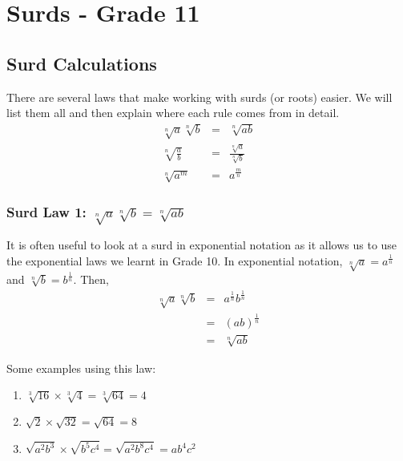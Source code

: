 \chapter{Surds - Grade 11}
\label{m:ng11}

\section{Surd Calculations}

There are several laws that make working with surds (or roots) easier. We will list them all and then explain where each rule comes from in detail.
\begin{eqnarray}
\label{eq:mn:s:1}
\sqrt[n]{a}\sqrt[n]{b}&=&\sqrt[n]{ab}\\
\label{eq:mn:s:2}
\sqrt[n]{\frac ab}&=&\frac{\sqrt[n]{a}}{\sqrt[n]{b}}\\
\label{eq:mn:s:3}
\sqrt[n]{a^m}&=&a^{\frac mn}
\end{eqnarray}

\subsection{Surd Law 1: $\sqrt[n]{a}\sqrt[n]{b}=\sqrt[n]{ab}$}
It is often useful to look at a surd in exponential notation as it allows us to use the exponential laws we learnt in Grade 10. In exponential notation, $\sqrt[n]{a}=a^{\frac{1}{n}}$ and $\sqrt[n]{b}=b^{\frac{1}{n}}$. Then,
\begin{eqnarray}
\label{eq:mn:s:1:exp}
\sqrt[n]{a}\sqrt[n]{b}&=&a^{\frac 1n}b^{\frac 1n}\\ \nonumber
&=&(ab)^{\frac 1n}\\ \nonumber
&=&\sqrt[n]{ab}
\end{eqnarray}

Some examples using this law:
\begin{enumerate}
\item{$\sqrt[3]{16}\times \sqrt[3]{4} = \sqrt[3]{64}=4$}
\item{$\sqrt{2}\times \sqrt{32}=\sqrt{64}=8$}
\item{$\sqrt{a^2b^3}\times \sqrt{b^5c^4}=\sqrt{a^2b^8c^4}= ab^4c^2$}
\end{enumerate}

